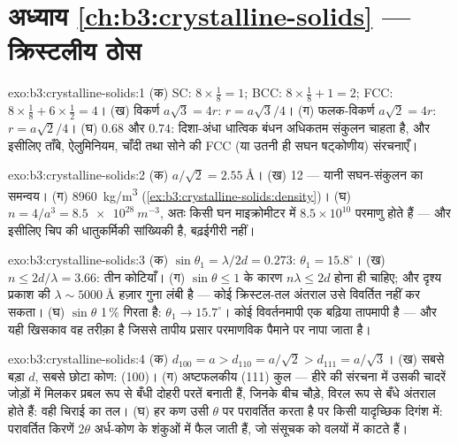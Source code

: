 \section*{अध्याय \ref{ch:b3:crystalline-solids} --- क्रिस्टलीय ठोस}

\begin{solution}{exo:b3:crystalline-solids:1}
(क) SC: $8\times\tfrac18 = 1$; BCC: $8\times\tfrac18 + 1 = 2$;
FCC: $8\times\tfrac18 + 6\times\tfrac12 = 4$। (ख) विकर्ण
$a\sqrt3 = 4r$: $r = a\sqrt3/4$। (ग) फलक-विकर्ण $a\sqrt2 = 4r$:
$r = a\sqrt2/4$। (घ) $0.68$ और $0.74$: दिशा-अंधा धात्विक
बंधन अधिकतम संकुलन चाहता है, और इसीलिए ताँबे, ऐलुमिनियम, चाँदी तथा
सोने की FCC (या उतनी ही सघन षट्कोणीय) संरचनाएँ।
\end{solution}

\begin{solution}{exo:b3:crystalline-solids:2}
(क) $a/\sqrt2 = \qty{2.55}{\angstrom}$। (ख) 12 --- यानी
सघन-संकुलन का समन्वय। (ग) \qty{8960}{kg/m^3}
(\cref{ex:b3:crystalline-solids:density})। (घ) $n = 4/a^3 =
\qty{8.5e28}{m^{-3}}$, अतः किसी घन माइक्रोमीटर में
$8.5\times10^{10}$ परमाणु होते हैं --- और इसीलिए चिप की धातुकर्मिकी
सांख्यिकी है, बढ़ईगीरी नहीं।
\end{solution}

\begin{solution}{exo:b3:crystalline-solids:3}
(क) $\sin\theta_1 = \lambda/2d = 0.273$: $\theta_1 =
15.8^\circ$। (ख) $n \le 2d/\lambda = 3.66$: तीन कोटियाँ। (ग)
$\sin\theta \le 1$ के कारण $n\lambda \le 2d$ होना ही चाहिए; और दृश्य
प्रकाश की $\lambda \sim \qty{5000}{\angstrom}$ हज़ार गुना लंबी है
--- कोई क्रिस्टल-तल अंतराल उसे विवर्तित नहीं कर सकता। (घ) $\sin\theta$
1\,\% गिरता है: $\theta_1 \to 15.7^\circ$। कोई विवर्तनमापी एक बढ़िया
तापमापी है --- और यही खिसकाव वह तरीक़ा है जिससे तापीय प्रसार
परमाणविक पैमाने पर नापा जाता है।
\end{solution}

\begin{solution}{exo:b3:crystalline-solids:4}
(क) $d_{100} = a > d_{110} = a/\sqrt2 > d_{111} = a/\sqrt3$। (ख)
सबसे बड़ा $d$, सबसे छोटा कोण: (100)। (ग) अष्टफलकीय (111)
कुल --- हीरे की संरचना में उसकी चादरें जोड़ों में मिलकर प्रबल रूप से
बँधी दोहरी परतें बनाती हैं, जिनके बीच चौड़े, विरल रूप से बँधे अंतराल
होते हैं: वही चिराई का तल। (घ) हर कण उसी $\theta$ पर परावर्तित करता है
पर किसी यादृच्छिक दिगंश में: परावर्तित किरणें
$2\theta$ अर्ध-कोण के शंकुओं में फैल जाती हैं, जो संसूचक को वलयों में
काटते हैं।
\end{solution}


